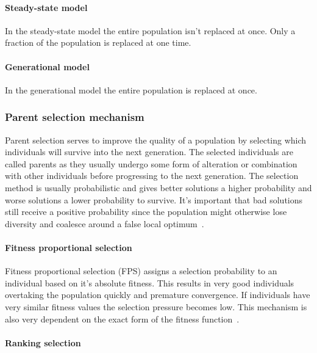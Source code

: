\paragraph{Steady-state model}

In the steady-state model the entire population isn't replaced at once. Only a fraction of the population is replaced at one time.

\paragraph{Generational model}

In the generational model the entire population is replaced at once.

\subsubsection{Parent selection mechanism}

Parent selection serves to improve the quality of a population by selecting which individuals will survive into the next generation. The selected individuals are called parents as they usually undergo some form of alteration or combination with other individuals before progressing to the next generation. The selection method is usually probabilistic and gives better solutions a higher probability and worse solutions a lower probability to survive. It's important that bad solutions still receive a positive probability since the population might otherwise lose diversity and coalesce around a false local optimum~\cite{Eiben2015_whatevolutionary}.



\paragraph{Fitness proportional selection}

Fitness proportional selection (FPS) assigns a selection probability to an individual based on it's absolute fitness. This results in very good individuals overtaking the population quickly and premature convergence. If individuals have very similar fitness values the selection pressure becomes low. This mechanism is also very dependent on the exact form of the fitness function~\cite{Eiben2015asdfasd}.

\paragraph{Ranking selection}

